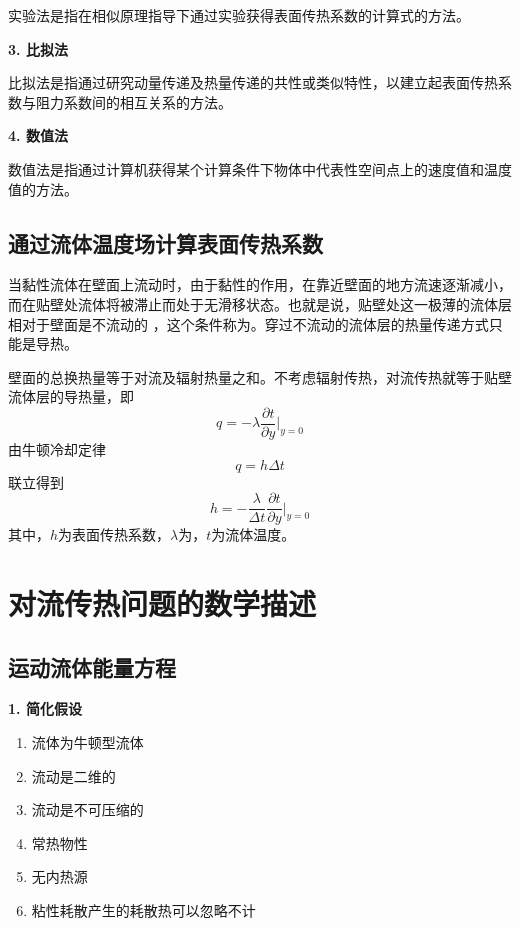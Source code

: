实验法是指在相似原理指导下通过实验获得表面传热系数的计算式的方法。

\noindent \textbf{3. 比拟法}

比拟法是指通过研究动量传递及热量传递的共性或类似特性，以建立起表面传热系数与阻力系数间的相互关系的方法。

\noindent \textbf{4. 数值法}

数值法是指通过计算机获得某个计算条件下物体中代表性空间点上的速度值和温度值的方法。
\vspace*{1em}

\subsection{通过流体温度场计算表面传热系数}
当黏性流体在壁面上流动时，由于黏性的作用，在靠近壁面的地方流速逐渐减小，而在贴壁处流体将被滞止而处于无滑移状态。也就是说，贴壁处这一极薄的流体层相对于壁面是不流动的
，这个条件称为。穿过不流动的流体层的热量传递方式只能是导热。

壁面的总换热量等于对流及辐射热量之和。不考虑辐射传热，对流传热就等于贴壁流体层的导热量，即
\begin{equation}
	q = - \lambda \dfrac{\partial t}{\partial y} \Bigg|_{y=0}
\end{equation}
由牛顿冷却定律
\begin{equation}
	q = h \Delta t
\end{equation}
联立得到
\begin{equation}
	h = - \dfrac{\lambda}{\Delta t} \dfrac{\partial t}{\partial y}\Bigg|_{y = 0}
\end{equation}
其中，$h$为表面传热系数，$\lambda$为，$t$为流体温度。


\section{对流传热问题的数学描述}
\subsection{运动流体能量方程}
\noindent \textbf{1. 简化假设}
\begin{enumerate}[\hspace*{2em} (1) ]
	\item 流体为牛顿型流体
\vspace*{-0.5em}
	\item 流动是二维的
\vspace*{-0.5em}
	\item 流动是不可压缩的
\vspace*{-0.5em}
	\item 常热物性
\vspace*{-0.5em}
	\item 无内热源
\vspace*{-0.5em}
	\item 粘性耗散产生的耗散热可以忽略不计
\end{enumerate}

